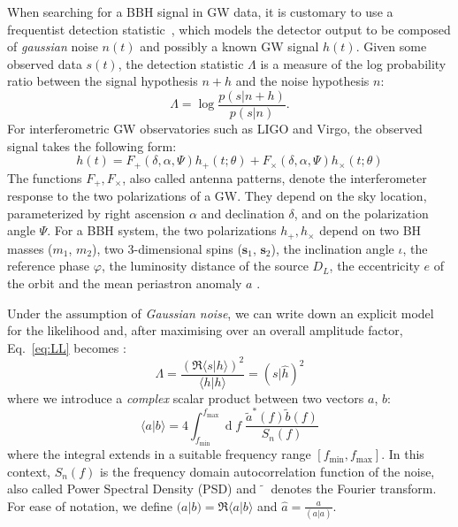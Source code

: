 \documentclass[twocolumn,showpacs,preprintnumbers,nofootinbib,prd,
superscriptaddress,10pt]{revtex4-2}
\renewcommand{\d}[1]{\ensuremath{\operatorname{d}\!{#1}}}
\newcommand{\scalar}[2]{\langle #1|#2 \rangle}
\newcommand{\rescalar}[2]{( #1 |#2 )}
\begin{document}
When searching for a BBH signal in GW data, it is customary to use a frequentist detection statistic~\cite{Creighton_book, Maggiore:2007ulw, Harry:2016ijz, Harry:2017weg}, which models the detector output to be composed of {\it gaussian} noise $n(t)$ and possibly a known GW signal $h(t)$.
Given some observed data $s(t)$, the detection statistic $\Lambda$ is a measure of the log probability ratio between the signal hypothesis $n+h$ and the noise hypothesis $n$:
\begin{equation}\label{eq:LL}
	\Lambda = \log\frac{p(s|n+h)}{p(s| n)}.
\end{equation}
For interferometric GW observatories such as LIGO and Virgo, the observed signal takes the following form:
\begin{equation}\label{eq:signal_model}
	h(t) = F_+(\delta, \alpha, \Psi) h_+(t;\theta) + F_\times(\delta, \alpha, \Psi) h_\times(t;\theta)
\end{equation}
The functions $F_+, F_\times$, also called antenna patterns, denote the interferometer response to the two polarizations of a GW. They depend on the sky location, parameterized by right ascension $\alpha$ and declination $\delta$, and on the polarization angle $\Psi$. 
For a BBH system, the two polarizations $h_+, h_\times$ depend on two BH masses ($m_1$, $m_2$), two 3-dimensional spins ($\mathbf{s}_1$, $\mathbf{s}_2$), the inclination angle $\iota$, the reference phase $\varphi$, the luminosity distance of the source $D_L$, the eccentricity $e$ of the orbit and the mean periastron anomaly $a$ \cite{Sathyaprakash_2009}.

Under the assumption of {\it Gaussian noise}, we can write down an explicit model for the likelihood and, after maximising over an overall amplitude factor, Eq.~\eqref{eq:LL} becomes \cite{Creighton_book, Maggiore:2007ulw, Harry:2016ijz}:
\begin{equation}\label{eq:LL_gauss}
	\Lambda = \frac{\left(\Re\scalar{s}{h}\right)^2}{\scalar{h}{h}} = \rescalar{s}{\hat{h}}^2
\end{equation}
where we introduce a {\it complex} scalar product between two vectors $a$, $b$:
\begin{equation} \label{eq:scalar_product}
	\scalar{a}{b} = 4 \int_{f_\text{min}}^{f_\text{max}} \!\!\!\! \d{f} \; \frac{\tilde{a}^*(f) \tilde{b}(f)}{S_n(f)}
\end{equation}
where the integral extends in a suitable frequency range $[f_\text{min}, f_\text{max}]$.
In this context, $S_n(f)$ is the frequency domain autocorrelation function of the noise, also called Power Spectral Density (PSD) and $\tilde{\phantom{a}}$ denotes the Fourier transform.
For ease of notation, we define ${\rescalar{a}{b} = \Re\scalar{a}{b}}$ and ${\hat{a} = \frac{a}{\rescalar{a}{a}}}$.
\end{document}
